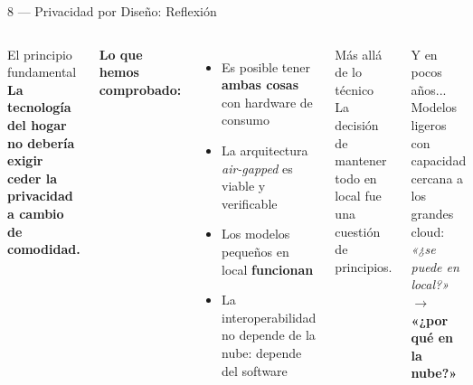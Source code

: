 \begin{frame}{8 — Privacidad por Diseño: Reflexión}
  \hypertarget{s:privacidad}{}
  \footnotesize
  \begin{columns}[T]
    \begin{block}{El principio fundamental}
      \centering
      \normalsize\textbf{La tecnología del hogar no debería\\[0.05cm]
      exigir ceder la privacidad a cambio de comodidad.}
    \end{block}

    \textbf{Lo que hemos comprobado:}
    \begin{itemize}
      \item Es posible tener \textbf{ambas cosas} con hardware de consumo
      \item La arquitectura \textit{air-gapped} es viable y verificable
      \item Los modelos pequeños en local \textbf{funcionan}
      \item La interoperabilidad no depende de la nube: depende del software
    \end{itemize}

    \begin{exampleblock}{Más allá de lo técnico}
      La decisión de mantener todo en local fue una cuestión de principios.
    \end{exampleblock}

    \begin{alertblock}{Y en pocos años...}
      Modelos ligeros con capacidad cercana a los grandes cloud:\\[0.1cm]
      \centering
      \textit{«¿se puede en local?»} $\rightarrow$
      \textbf{«¿por qué en la nube?»}
    \end{alertblock}
  \end{columns}
\end{frame}

